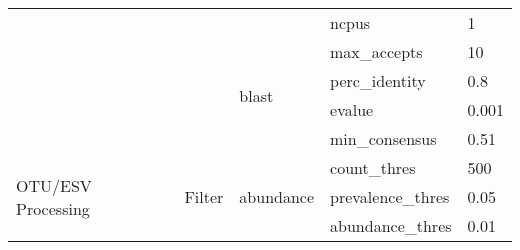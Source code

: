 \begin{table}[h]
{\begin{tabular}{lllll}
                                          &                                                          &                                        & ncpus                                  & 1                                                                                                        \\
                                          &                                                          & \multirow{4}{*}{blast}                 & max\_accepts                           & 10                                                                                                       \\
                                          &                                                          &                                        & perc\_identity                         & 0.8                                                                                                      \\
                                          &                                                          &                                        & evalue                                 & 0.001                                                                                                    \\
                                          &                                                          &                                        & min\_consensus                         & 0.51                                                                                                     \\ \hline
\multirow{12}{*}{OTU/ESV Processing}      & \multirow{5}{*}{Filter}                                  & \multirow{3}{*}{abundance}             & count\_thres                           & 500                                                                                                      \\
                                          &                                                          &                                        & prevalence\_thres                      & 0.05                                                                                                     \\
                                          &                                                          &                                        & abundance\_thres                       & 0.01                                                                                                     \\

\end{tabular}}
\end{table}
